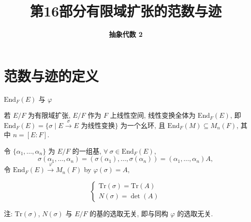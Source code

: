 \everymath{\displaystyle}



\title[有限域扩张的范数与迹]{\texorpdfstring{\LARGE \bfseries 第16部分\quad 有限域扩张的范数与迹}{第16部分 有限域扩张的范数与迹}}
\author[抽象代数 2]{\Large \bfseries 抽象代数 2}
\date{}





\begin{frame}

\titlepage %

\end{frame}


\section[定义]{范数与迹的定义}


\begin{frame}{$\mathrm{End}_F(E)$ 与 $\varphi$}

若 $E/F$ 为有限域扩张, $E/F$ 作为 $F$ 上线性空间, 线性变换全体为
$\mathrm{End}_F(E)$,
即 $\mathrm{End}_F(E) = \{ \sigma \mid E \xrightarrow{\ \sigma\ } E \text{ 为线性变换} \}$
为一个幺环, 且 $\mathrm{End}_F(M) \subseteq M_n(F)$, 其中 $n = [E:F]$.

\pause

令 $\{ \alpha_1, \dots, \alpha_n \}$ 为 $E/F$ 的一组基,
$\forall\ \sigma \in \mathrm{End}_F(E)$,
\[
\sigma(\alpha_1, \dots, \alpha_n) = (\sigma(\alpha_1), \dots, \sigma(\alpha_n))
= (\alpha_1, \dots, \alpha_n)A,
\]
令 $\mathrm{End}_F(E) \xrightarrow{\ \varphi\ } M_n(F)$ by $\varphi(\sigma) = A$,

\pause

\begin{Def}[迹与范数]
\[
\begin{cases}
\mathrm{Tr}(\sigma) = \mathrm{Tr}(A) \\
N(\sigma) = \det(A)
\end{cases}
\]
\end{Def}

注: $\mathrm{Tr}(\sigma)$, $N(\sigma)$ 与 $E/F$ 的基的选取无关,
即与同构 $\varphi$ 的选取无关.

\end{frame}

